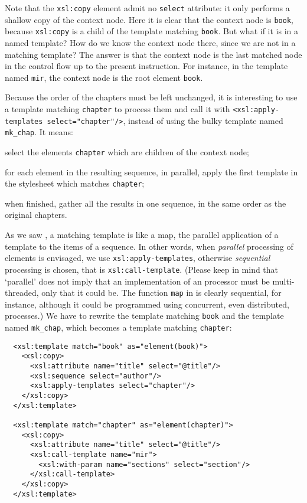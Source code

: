 Note that the \texttt{xsl:copy} element admit no \texttt{select}
attribute: it only performs a shallow copy of the context node. Here
it is clear that the context node is \texttt{book}, because
\texttt{xsl:copy} is a child of the template matching
\texttt{book}. But what if it is in a named template? How do we know
the context node there, since we are not in a matching template? The
answer is that the context node is the last matched node in the
control flow up to the present instruction. For instance, in the
template named \texttt{mir}, the context node is the root element
\texttt{book}.

Because the order of the chapters must be left unchanged, it is
interesting to use a template matching \texttt{chapter} to process
them and call it with \texttt{<xsl:apply-templates select="chapter"/>},
instead of using the bulky template named \texttt{mk\_chap}. It means:
\begin{enumerate*}

\item select the elements \texttt{chapter} which are children of the
  context node;

\item for each element in the resulting sequence, in parallel, apply
  the first template in the stylesheet which matches \texttt{chapter};

\item when finished, gather all the results in one sequence, in the
  same order as the original chapters.

\end{enumerate*}
As we saw , a matching template is like a map,
the parallel application of a template to the items of a sequence. In
other words, when \emph{parallel} processing of elements is envisaged,
we use \texttt{xsl:apply-templates}, otherwise \emph{sequential}
processing is chosen, that is \texttt{xsl:call-template}. (Please keep
in mind that `parallel' does not imply that an implementation of an
\XSLT processor must be multi\hyp{}threaded, only that it could
be. The function \texttt{map} in \Erlang is clearly sequential, for
instance, although it could be programmed using concurrent, even
distributed, processes.) We have to rewrite the template matching
\texttt{book} and the template named \texttt{mk\_chap}, which becomes
a template matching \texttt{chapter}:
\begin{verbatim}
  <xsl:template match="book" as="element(book)">
    <xsl:copy>
      <xsl:attribute name="title" select="@title"/>
      <xsl:sequence select="author"/>
      <xsl:apply-templates select="chapter"/>
    </xsl:copy>
  </xsl:template>

  <xsl:template match="chapter" as="element(chapter)">
    <xsl:copy>
      <xsl:attribute name="title" select="@title"/>
      <xsl:call-template name="mir">
        <xsl:with-param name="sections" select="section"/>
      </xsl:call-template>
    </xsl:copy>
  </xsl:template>
\end{verbatim}
